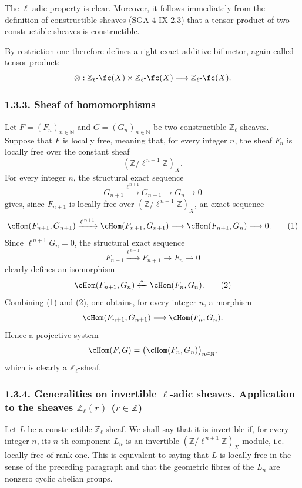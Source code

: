 \begin{prooftext}[Proof]
The \(\ell\)-adic property is clear. Moreover, it follows immediately from the definition of constructible sheaves (SGA 4 IX 2.3) that a tensor product of two constructible sheaves is constructible.
\end{prooftext}

By restriction one therefore defines a right exact additive bifunctor, again called tensor product:
\[
\otimes:\mathbb Z_\ell\text{-}\fc(X)\times \mathbb Z_\ell\text{-}\fc(X)
\longrightarrow \mathbb Z_\ell\text{-}\fc(X).
\]

\subsubsection*{1.3.3. Sheaf of homomorphisms}

Let \(F=(F_n)_{n\in\mathbb N}\) and \(G=(G_n)_{n\in\mathbb N}\) be two constructible \(\mathbb Z_\ell\)-sheaves. Suppose that \(F\) is locally free, meaning that, for every integer \(n\), the sheaf \(F_n\) is locally free over the constant sheaf
\[
(\mathbb Z/\ell^{\,n+1}\mathbb Z)_X.
\]
For every integer \(n\), the structural exact sequence
\[
G_{n+1}\xrightarrow{\ell^{\,n+1}}G_{n+1}\longrightarrow G_n\longrightarrow 0
\]
gives, since \(F_{n+1}\) is locally free over \((\mathbb Z/\ell^{\,n+1}\mathbb Z)_X\), an exact sequence
\[
\cHom(F_{n+1},G_{n+1})
 \xrightarrow{\ell^{\,n+1}}
\cHom(F_{n+1},G_{n+1})
 \longrightarrow
\cHom(F_{n+1},G_n)
 \longrightarrow 0.
\tag{1}
\]
Since \(\ell^{\,n+1}G_n=0\), the structural exact sequence
\[
F_{n+1}\xrightarrow{\ell^{\,n+1}}F_{n+1}\longrightarrow F_n\longrightarrow 0
\]
clearly defines an isomorphism
\[
\cHom(F_{n+1},G_n)\xleftarrow{\sim}\cHom(F_n,G_n).
\tag{2}
\]
Combining (1) and (2), one obtains, for every integer \(n\), a morphism
\[
\cHom(F_{n+1},G_{n+1})\longrightarrow \cHom(F_n,G_n).
\]
Hence a projective system
\[
\cHom(F,G)=\bigl(\cHom(F_n,G_n)\bigr)_{n\in\mathbb N},
\]
which is clearly a \(\mathbb Z_\ell\)-sheaf.

\subsubsection*{1.3.4. Generalities on invertible \(\ell\)-adic sheaves. Application to the sheaves \(\mathbb Z_\ell(r)\) (\(r\in\mathbb Z\))}

Let \(L\) be a constructible \(\mathbb Z_\ell\)-sheaf. We shall say that it is invertible if, for every integer \(n\), its \(n\)-th component \(L_n\) is an invertible \((\mathbb Z/\ell^{\,n+1}\mathbb Z)_X\)-module, i.e. locally free of rank one. This is equivalent to saying that \(L\) is locally free in the sense of the preceding paragraph and that the geometric fibres of the \(L_n\) are nonzero cyclic abelian groups.

